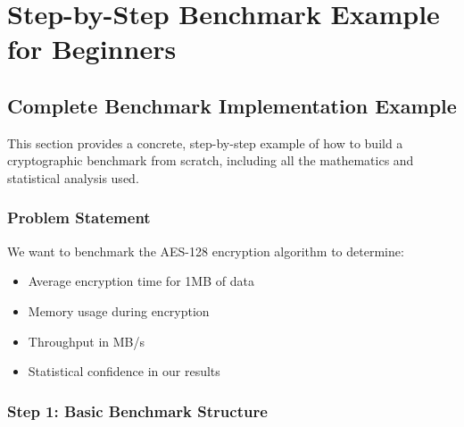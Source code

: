 \documentclass[12pt,a4paper]{article}
\begin{document}
\section{Step-by-Step Benchmark Example for Beginners}

\subsection{Complete Benchmark Implementation Example}

This section provides a concrete, step-by-step example of how to build a cryptographic benchmark from scratch, including all the mathematics and statistical analysis used.

\subsubsection{Problem Statement}
We want to benchmark the AES-128 encryption algorithm to determine:
\begin{itemize}
    \item Average encryption time for 1MB of data
    \item Memory usage during encryption
    \item Throughput in MB/s
    \item Statistical confidence in our results
\end{itemize}

\subsubsection{Step 1: Basic Benchmark Structure}
\end{document}
